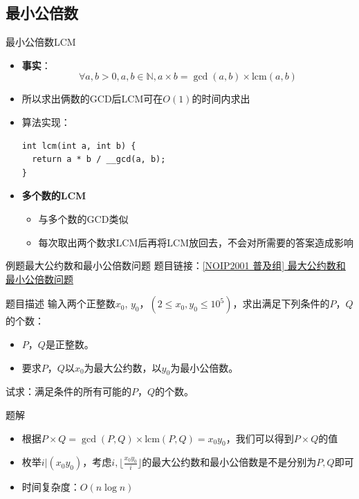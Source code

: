 \documentclass[9pt, c]{beamer}	%
\newcommand{\N}{\mathbb{N}}
\theoremstyle{plain}
\theoremstyle{definition}
\theoremstyle{remark}
\numberwithin{equation}{section}
\begin{document}
\subsection{最小公倍数}
\begin{frame}[fragile]{最小公倍数}{LCM}
  \begin{itemize}
    \item \textbf{事实}：
    $$\forall a,b>0,a,b\in \N, a\times b=\gcd(a,b)\times \text{lcm}(a,b)$$
    \item 所以求出俩数的GCD后LCM可在$O(1)$的时间内求出
    \pause
    \item 算法实现：
    \begin{lstlisting}
int lcm(int a, int b) {
  return a * b / __gcd(a, b);
}
    \end{lstlisting}
    \pause
    \item \textbf{多个数的LCM}
    \begin{itemize}
      \item 与多个数的GCD类似
      \pause
      \item 每次取出两个数求LCM后再将LCM放回去，不会对所需要的答案造成影响
    \end{itemize}
  \end{itemize}
\end{frame}

\begin{frame}{例题}{最大公约数和最小公倍数问题}
  题目链接：\href{https://www.luogu.com.cn/problem/P1029}{[NOIP2001 普及组] 最大公约数和最小公倍数问题}
  \begin{block}{题目描述}
    输入两个正整数$x_0$, $y_0$，$(2\leq x_0,y_0\leq 10^5)$，求出满足下列条件的$P$，$Q$的个数：
    \begin{itemize}
      \item $P$，$Q$是正整数。
      \item 要求$P$，$Q$以$x_0$为最大公约数，以$y_0$为最小公倍数。
    \end{itemize}
    试求：满足条件的所有可能的$P$，$Q$的个数。
  \end{block}
  \vspace{0.3cm}
  \pause
  \begin{exampleblock}{题解}
    \begin{itemize}
      \item 根据$P\times Q=\gcd(P,Q)\times \text{lcm}(P,Q)=x_0y_0$，我们可以得到$P\times Q$的值
      \item 枚举$i|(x_0y_0)$，考虑$i,\lfloor \frac{x_0y_0}{i} \rfloor$的最大公约数和最小公倍数是不是分别为$P,Q$即可
      \pause
      \item 时间复杂度：$O(n\log{n})$
    \end{itemize}
  \end{exampleblock}
\end{frame}
\end{document}
